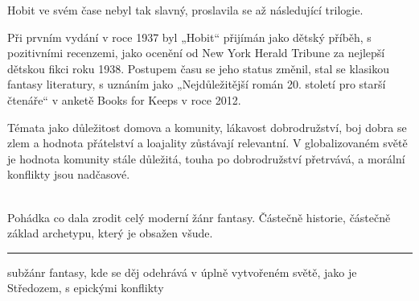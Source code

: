 \documentclass[FGBook.tex]{subfiles}
\begin{document}
\noindent Hobit ve svém čase nebyl tak slavný, proslavila se až následující trilogie.

Při prvním vydání v roce 1937 byl „Hobit“ přijímán jako dětský příběh,
s pozitivními recenzemi,
jako ocenění od New York Herald Tribune za nejlepší dětskou fikci roku 1938.
Postupem času se jeho status změnil, stal se klasikou fantasy literatury,
s uznáním jako „Nejdůležitější román 20. století pro starší čtenáře“
v anketě Books for Keeps v roce 2012.

\noindent Témata jako důležitost domova a komunity, lákavost dobrodružství,
boj dobra se zlem a hodnota přátelství a loajality zůstávají relevantní.
V globalizovaném světě je hodnota komunity stále důležitá, touha po dobrodružství přetrvává,
a morální konflikty jsou nadčasové.

\vspace*{2em}\\
\noindent 
Pohádka co dala zrodit celý moderní žánr fantasy. Částečně historie, částečně základ archetypu, který je obsažen všude.

\vfill

\noindent\begin{minipage}{\textwidth}
    {\textcolor{\wpagecolor}{\rule{\linewidth}{0.4pt}}
    \footnotesize
     subžánr fantasy, kde se děj odehrává v úplně vytvořeném světě,
    jako je Středozem, s epickými konflikty
    }
\end{minipage}

\newpage
\end{document}
